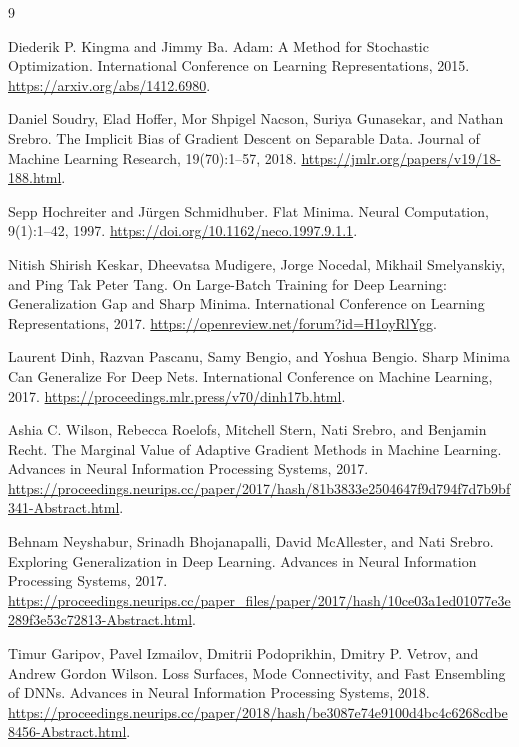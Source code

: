 \documentclass[11pt]{article}
\begin{document}
\begin{thebibliography}{9}

Diederik P. Kingma and Jimmy Ba.
\newblock Adam: A Method for Stochastic Optimization.
\newblock International Conference on Learning Representations, 2015.
\newblock \url{https://arxiv.org/abs/1412.6980}.

Daniel Soudry, Elad Hoffer, Mor Shpigel Nacson, Suriya Gunasekar, and Nathan Srebro.
\newblock The Implicit Bias of Gradient Descent on Separable Data.
\newblock Journal of Machine Learning Research, 19(70):1--57, 2018.
\newblock \url{https://jmlr.org/papers/v19/18-188.html}.

Sepp Hochreiter and J\"urgen Schmidhuber.
\newblock Flat Minima.
\newblock Neural Computation, 9(1):1--42, 1997.
\newblock \url{https://doi.org/10.1162/neco.1997.9.1.1}.

Nitish Shirish Keskar, Dheevatsa Mudigere, Jorge Nocedal, Mikhail Smelyanskiy, and Ping Tak Peter Tang.
\newblock On Large-Batch Training for Deep Learning: Generalization Gap and Sharp Minima.
\newblock International Conference on Learning Representations, 2017.
\newblock \url{https://openreview.net/forum?id=H1oyRlYgg}.

Laurent Dinh, Razvan Pascanu, Samy Bengio, and Yoshua Bengio.
\newblock Sharp Minima Can Generalize For Deep Nets.
\newblock International Conference on Machine Learning, 2017.
\newblock \url{https://proceedings.mlr.press/v70/dinh17b.html}.

Ashia C. Wilson, Rebecca Roelofs, Mitchell Stern, Nati Srebro, and Benjamin Recht.
\newblock The Marginal Value of Adaptive Gradient Methods in Machine Learning.
\newblock Advances in Neural Information Processing Systems, 2017.
\newblock \url{https://proceedings.neurips.cc/paper/2017/hash/81b3833e2504647f9d794f7d7b9bf341-Abstract.html}.

Behnam Neyshabur, Srinadh Bhojanapalli, David McAllester, and Nati Srebro.
\newblock Exploring Generalization in Deep Learning.
\newblock Advances in Neural Information Processing Systems, 2017.
\newblock \url{https://proceedings.neurips.cc/paper_files/paper/2017/hash/10ce03a1ed01077e3e289f3e53c72813-Abstract.html}.

Timur Garipov, Pavel Izmailov, Dmitrii Podoprikhin, Dmitry P. Vetrov, and Andrew Gordon Wilson.
\newblock Loss Surfaces, Mode Connectivity, and Fast Ensembling of DNNs.
\newblock Advances in Neural Information Processing Systems, 2018.
\newblock \url{https://proceedings.neurips.cc/paper/2018/hash/be3087e74e9100d4bc4c6268cdbe8456-Abstract.html}.


\end{thebibliography}
\end{document}
